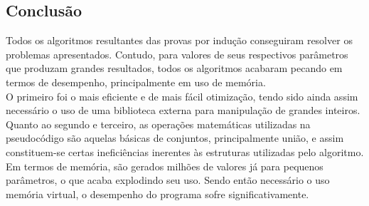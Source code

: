 \documentclass[twoside]{article}
\begin{document}
\begin{multicols}{2}
\section{Conclusão}
\indent	Todos os algoritmos resultantes das provas por indução conseguiram resolver os problemas apresentados. Contudo, para valores de seus respectivos parâmetros que produzam grandes resultados, todos os algoritmos acabaram pecando em termos de desempenho, principalmente em uso de memória.\\

\indent O primeiro foi o mais eficiente e de mais fácil otimização, tendo sido ainda assim necessário o uso de uma biblioteca externa para manipulação de grandes inteiros.\\

\indent Quanto ao segundo e terceiro, as operações matemáticas utilizadas na pseudocódigo são aquelas básicas de conjuntos, principalmente união, e assim constituem-se certas ineficiências inerentes às estruturas utilizadas pelo algoritmo. Em termos de memória, são gerados milhões de valores já para pequenos parâmetros, o que acaba explodindo seu uso. Sendo então necessário o uso memória virtual, o desempenho do programa sofre significativamente.\\


\indent 








\end{multicols}
\end{document}
